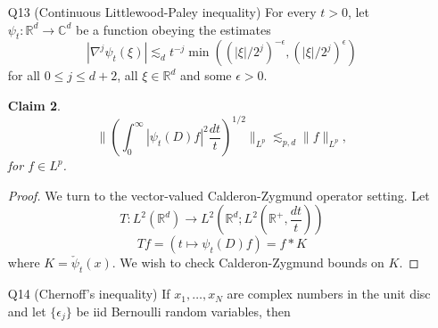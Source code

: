 \documentclass[11pt]{article}
\newtheorem{lem}[thm]{Lemma}
\newtheorem*{claim}{Claim}
\theoremstyle{remark}
\newcommand{\1}{\textbf{1}}
\newcommand{\lle}{\lesssim}
\def\norm#1{\| #1  \|}
\newcommand{\bbR}{\mathbb{R}}
\newcommand{\bbZ}{\mathbb{Z}}
\newcommand{\bbT}{\mathbb{T}}
\newcommand{\bbC}{\mathbb{C}}
\begin{document}
\begin{enumerate}
Let $m: \bbR^d$ be continuous and an $M^p(\bbR^d)$ multiplier for some $1 \leq p \leq \infty$.
\begin{claim}
\[
\norm{m|_{\bbZ^d}}_{M^p(\bbZ^d)} \leq \norm{m}_{M^p(\bbR^d)}.
\]
\end{claim}
\begin{proof}
Let $f,g \in L^p(\bbT^d)$ and extend them periodically to $\bbR^d$. Let $\varphi_\epsilon$ be an approximate identity, say a Gaussian, and with the usual notation, consider
\[
\int_{\bbR^d} (m(D) f_{\epsilon/p})(g_{\epsilon/p'}) \lle \norm{m}_{M^p} \norm{f_{\epsilon}}_p \norm{g_{\epsilon}}_{p'}.
\]
We can write this since $f_\epsilon$ and $g_\epsilon$ will lie in $L^p$ and $L^{p'}$, respectively, for any $p$. We now have two limits to consider, the first is
\begin{lem}
\[
\lim_{\epsilon \to 0} \left(\epsilon^{d/2} \int_{\bbR^d} |f(x)|^p dx \right)^{1/p} = \int_{\bbT^d} |f(x)| dx.
\]
\end{lem}
\begin{proof}
\end{proof}
The second is
\begin{lem}
\[
\lim_{\epsilon \to 0} \epsilon^{d/2} \int_{\bbR^d} (m(D) f_{\epsilon/p})(g_{\epsilon/p'})
\]
\end{lem}
\begin{proof}
\end{proof}
\end{proof}
\item[Q13](Continuous Littlewood-Paley inequality) For every $t > 0$, let $\psi_t : \bbR^d \to \bbC^d$ be a function obeying the estimates
\[
|\nabla^j \psi_t(\xi)| \lle_d t^{-j} \min((|\xi|/2^j)^{-\epsilon}, (|\xi|/2^j)^\epsilon)
\]
for all $0 \leq j \leq d+2$, all $\xi \in \bbR^d$ and some $\epsilon > 0$. 
\begin{claim}
\[
\norm{( \int_0^\infty |\psi_t(D) f|^2 \frac{dt}{t})^{1/2}}_{L^p} \lle_{p,d} \norm{f}_{L^p},
\]
for $f \in L^p$.
\end{claim}
\begin{proof}
We turn to the vector-valued Calderon-Zygmund operator setting. Let 
\[
T : L^2(\bbR^d) \to L^2( \bbR^d ; L^2(\bbR^+, \frac{dt}{t}))
\]
\[
Tf = (t \mapsto \psi_t(D) f) = f * K
\]
where $K = \check{\psi}_t(x)$. We wish to check Calderon-Zygmund bounds on $K$.
\end{proof}
\item[Q14] (Chernoff's inequality) If $x_1, \ldots, x_N$ are complex numbers in the unit disc and let $\{\epsilon_j\}$ be iid Bernoulli random variables, then

\end{enumerate}
\end{document}
